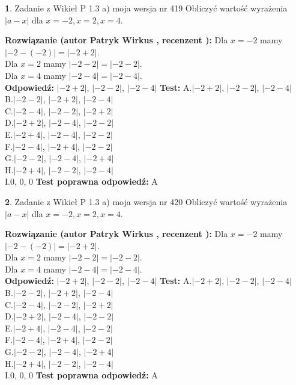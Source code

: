 \documentclass[12pt, a4paper]{article}
\theoremstyle{definition} %
\newtheorem{zad}{}
\newcommand{\zadStart}[1]{\begin{zad}#1\newline}
\newcommand{\zadStop}{\end{zad}}
\newcommand{\rozwStart}[2]{\noindent \textbf{Rozwiązanie (autor #1 , recenzent #2): }\newline}
\newcommand{\rozwStop}{\newline}
\newcommand{\odpStart}{\noindent \textbf{Odpowiedź:}\newline}
\newcommand{\odpStop}{\newline}
\newcommand{\testStart}{\noindent \textbf{Test:}\newline}
\newcommand{\testStop}{\newline}
\newcommand{\kluczStart}{\noindent \textbf{Test poprawna odpowiedź:}\newline}
\newcommand{\kluczStop}{\newline}
\begin{document}
\zadStart{Zadanie z Wikieł P 1.3 a) moja wersja nr 419}
Obliczyć wartość wyrażenia $|a - x|$ dla $x=-2,x=2,x=4$.
\zadStop
\rozwStart{Patryk Wirkus}{}
Dla $x = -2$ mamy $|-2 - (-2)| = |-2 + 2|$.\\
Dla $x = 2$ mamy $|-2 - 2| = |-2 - 2|$.\\
Dla $x = 4$ mamy $|-2 - 4| = |-2 - 4|$.\\
\rozwStop
\odpStart
$|-2 + 2|$, $|-2 - 2|$, $|-2 - 4|$
\odpStop
\testStart
A.$|-2 + 2|$, $|-2 - 2|$, $|-2 - 4|$\\
B.$|-2 - 2|$, $|-2 + 2|$, $|-2 - 4|$\\
C.$|-2 - 4|$, $|-2 - 2|$, $|-2 + 2|$\\
D.$|-2 + 2|$, $|-2 - 4|$, $|-2 - 2|$\\
E.$|-2 + 4|$, $|-2 - 4|$, $|-2 - 2|$\\
F.$|-2 - 4|$, $|-2 + 4|$, $|-2 - 2|$\\
G.$|-2 - 2|$, $|-2 - 4|$, $|-2 + 4|$\\
H.$|-2 + 4|$, $|-2 - 2|$, $|-2 - 4|$\\
I.$0$, $0$, $0$
\testStop
\kluczStart
A
\kluczStop



\zadStart{Zadanie z Wikieł P 1.3 a) moja wersja nr 420}
Obliczyć wartość wyrażenia $|a - x|$ dla $x=-2,x=2,x=4$.
\zadStop
\rozwStart{Patryk Wirkus}{}
Dla $x = -2$ mamy $|-2 - (-2)| = |-2 + 2|$.\\
Dla $x = 2$ mamy $|-2 - 2| = |-2 - 2|$.\\
Dla $x = 4$ mamy $|-2 - 4| = |-2 - 4|$.\\
\rozwStop
\odpStart
$|-2 + 2|$, $|-2 - 2|$, $|-2 - 4|$
\odpStop
\testStart
A.$|-2 + 2|$, $|-2 - 2|$, $|-2 - 4|$\\
B.$|-2 - 2|$, $|-2 + 2|$, $|-2 - 4|$\\
C.$|-2 - 4|$, $|-2 - 2|$, $|-2 + 2|$\\
D.$|-2 + 2|$, $|-2 - 4|$, $|-2 - 2|$\\
E.$|-2 + 4|$, $|-2 - 4|$, $|-2 - 2|$\\
F.$|-2 - 4|$, $|-2 + 4|$, $|-2 - 2|$\\
G.$|-2 - 2|$, $|-2 - 4|$, $|-2 + 4|$\\
H.$|-2 + 4|$, $|-2 - 2|$, $|-2 - 4|$\\
I.$0$, $0$, $0$
\testStop
\kluczStart
A
\kluczStop
\end{document}
